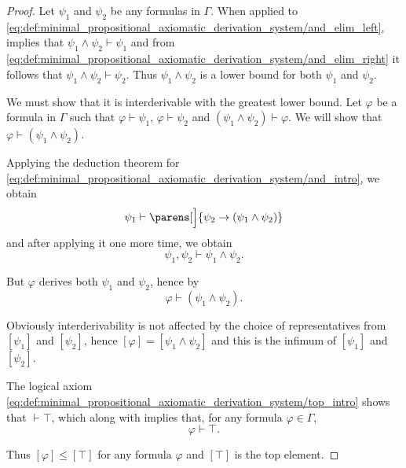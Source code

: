\begin{proof}
   Let \( \psi_1 \) and \( \psi_2 \) be any formulas in \( \Gamma \). When applied to \eqref{eq:def:minimal_propositional_axiomatic_derivation_system/and_elim_left},  implies that \( \psi_1 \wedge \psi_2 \vdash \psi_1 \) and from \eqref{eq:def:minimal_propositional_axiomatic_derivation_system/and_elim_right} it follows that \( \psi_1 \wedge \psi_2 \vdash \psi_2 \). Thus \( \psi_1 \wedge \psi_2 \) is a lower bound for both \( \psi_1 \) and \( \psi_2 \).

  We must show that it is interderivable with the greatest lower bound. Let \( \varphi \) be a formula in \( \Gamma \) such that \( \varphi \vdash \psi_1 \), \( \varphi \vdash \psi_2 \) and \( (\psi_1 \wedge \psi_2) \vdash \varphi \). We will show that \( \varphi \vdash (\psi_1 \wedge \psi_2) \).

  Applying the deduction theorem for \eqref{eq:def:minimal_propositional_axiomatic_derivation_system/and_intro}, we obtain
  \begin{equation*}
    \psi_1 \vdash \parens[\Big]{ \psi_2 \rightarrow (\psi_1 \wedge \psi_2) }
  \end{equation*}
  and after applying it one more time, we obtain
  \begin{equation*}
    \psi_1, \psi_2 \vdash \psi_1 \wedge \psi_2.
  \end{equation*}

  But \( \varphi \) derives both \( \psi_1 \) and \( \psi_2 \), hence by 
  \begin{equation*}
    \varphi \vdash (\psi_1 \wedge \psi_2).
  \end{equation*}

  Obviously interderivability is not affected by the choice of representatives from \( [\psi_1] \) and \( [\psi_2] \), hence \( [\varphi] = [\psi_1 \wedge \psi_2] \) and this is the infimum of \( [\psi_1] \) and \( [\psi_2] \).

  The logical axiom \eqref{eq:def:minimal_propositional_axiomatic_derivation_system/top_intro} shows that \( \vdash \top \), which along with  implies that, for any formula \( \varphi \in \Gamma \),
  \begin{equation*}
    \varphi \vdash \top.
  \end{equation*}

  Thus \( [\varphi] \leq [\top] \) for any formula \( \varphi \) and \( [\top] \) is the top element.


\end{proof}
